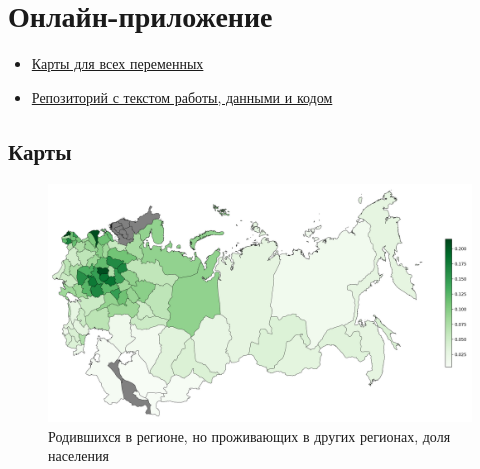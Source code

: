 \documentclass[a4paper,12pt]{article}
\let\oldsection\section
\renewcommand\section{\clearpage\oldsection}
\begin{document}





\oldsection{Онлайн-приложение}\label{app:online}

\begin{itemize}
	\item 
	\href{https://russia-migrations-1897.herokuapp.com}{Карты для всех переменных}
	\item \href{https://github.com/fant0md/empire-migrations-coursework}{Репозиторий с текстом работы, данными и кодом}
\end{itemize}


\begin{landscape}

\section{Карты}

\begin{figure}[h!]
	\includegraphics[height=0.85\textwidth]{mig_of_pop_from.png}
	\caption{Родившихся в регионе, но проживающих в других регионах, доля населения}
	\label{fig:from}
\end{figure}
	

\end{landscape}
\end{document}
